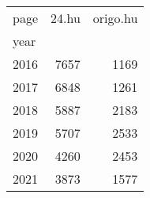 \begin{tabular}{lrr}
\toprule
page &  24.hu &  origo.hu \\
year &        &           \\
\midrule
2016 &   7657 &      1169 \\
2017 &   6848 &      1261 \\
2018 &   5887 &      2183 \\
2019 &   5707 &      2533 \\
2020 &   4260 &      2453 \\
2021 &   3873 &      1577 \\
\bottomrule
\end{tabular}
